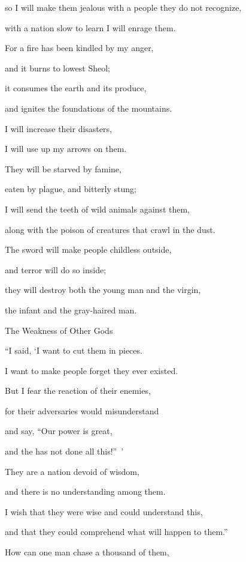 {\par }{\Q so I
will make them jealous
with a people
they do not
recognize,

\par }{\Q with a nation
slow to learn
I will enrage them.
\par }{\Q {}For
a fire
has been kindled
by my anger,
\par }{\Q and it burns
to
lowest
Sheol;
\par }{\Q it consumes
the earth
and its produce,
\par }{\Q and ignites
the foundations
of the mountains.
\par }{\Q {}I will increase
their disasters,
\par }{\Q I will use up my arrows
on
them.
\par }{\Q {}They will be starved
by famine,
\par }{\Q eaten
by plague,
and bitterly
stung;
\par }{\Q I will send
the teeth
of wild animals
against them,
\par }{\Q along with
the poison
of creatures that crawl
in the dust.
\par }{\Q {}The sword
will make people childless
outside,
\par }{\Q and terror
will do so inside;
\par }{\Q they will destroy both
the young man
and the virgin,
\par }{\Q the infant
and the gray-haired
man.
\par }{\SH The Weakness of Other Gods
\par }{\Q {}“I said,
‘I want
to cut them
in pieces.

\par }{\Q I want
to make
people
forget
they ever
existed.
\par }{\Q {}But I fear
the reaction
of their enemies,
\par }{\Q for their adversaries
would misunderstand
\par }{\Q and say,
“Our power
is great,

\par }{\Q and the
{}
has not
done
all
this!” ’
\par }{\Q {}They are a nation
devoid
of wisdom,
\par }{\Q and there is no
understanding among them.
\par }{\Q {}I wish
that they were wise
and could understand
this,
\par }{\Q and that they could comprehend what
will happen to them.”
\par }{\Q {}How
can one
man chase
a thousand
of them,

}
